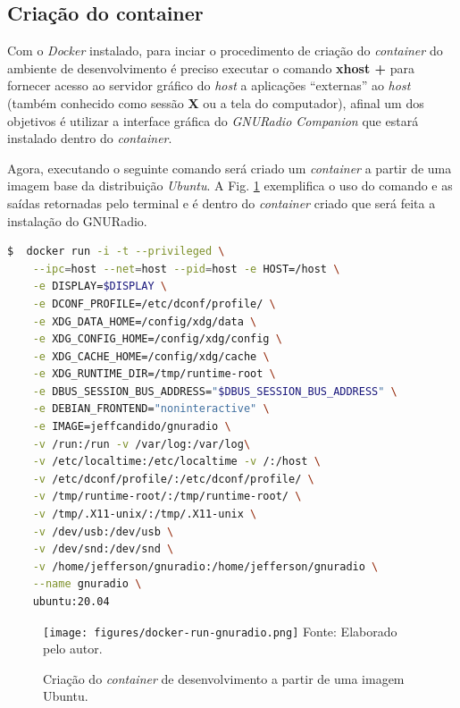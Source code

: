 \documentclass[
  12pt,				%
  openright,			%
  twoside,			%
  a4paper,			%
  english,			%
  french,				%
  spanish,			%
  brazil,				%
  ]{abntex2}
\begin{document}
\subsection*{Criação do container}

Com o \textit{Docker} instalado, para inciar o procedimento de criação do \textit{container} do ambiente de desenvolvimento é preciso executar o comando \textbf{xhost +}
para fornecer acesso ao servidor gráfico do \textit{host} a aplicações “externas” ao \textit{host} (também conhecido como sessão \textbf{X} ou a tela do computador),
afinal um dos objetivos é utilizar a interface gráfica do \textit{GNURadio Companion} que estará instalado dentro do \textit{container}.

Agora, executando o seguinte comando será criado um \textit{container} a partir de uma imagem base da distribuição \textit{Ubuntu}. A Fig.
\ref{fig:docker-run-gnuradio} exemplifica o uso do comando e as saídas retornadas pelo terminal e é dentro do \textit{container}
criado que será feita a instalação do GNURadio.

\begin{adjustbox}{max width=\linewidth}
  \begin{lstlisting}[language=bash]
$  docker run -i -t --privileged \
    --ipc=host --net=host --pid=host -e HOST=/host \
    -e DISPLAY=$DISPLAY \
    -e DCONF_PROFILE=/etc/dconf/profile/ \
    -e XDG_DATA_HOME=/config/xdg/data \
    -e XDG_CONFIG_HOME=/config/xdg/config \
    -e XDG_CACHE_HOME=/config/xdg/cache \
    -e XDG_RUNTIME_DIR=/tmp/runtime-root \
    -e DBUS_SESSION_BUS_ADDRESS="$DBUS_SESSION_BUS_ADDRESS" \
    -e DEBIAN_FRONTEND="noninteractive" \
    -e IMAGE=jeffcandido/gnuradio \
    -v /run:/run -v /var/log:/var/log\
    -v /etc/localtime:/etc/localtime -v /:/host \
    -v /etc/dconf/profile/:/etc/dconf/profile/ \
    -v /tmp/runtime-root/:/tmp/runtime-root/ \
    -v /tmp/.X11-unix/:/tmp/.X11-unix \
    -v /dev/usb:/dev/usb \
    -v /dev/snd:/dev/snd \
    -v /home/jefferson/gnuradio:/home/jefferson/gnuradio \
    --name gnuradio \
    ubuntu:20.04
  \end{lstlisting}
\end{adjustbox}


\begin{figure}[!htb]
  \centering
  \caption{Criação do \textit{container} de desenvolvimento a partir de uma imagem Ubuntu.}
  \texttt{[image: figures/docker-run-gnuradio.png]}
  Fonte: Elaborado pelo autor.
  \label{fig:docker-run-gnuradio}
\end{figure}
\end{document}
